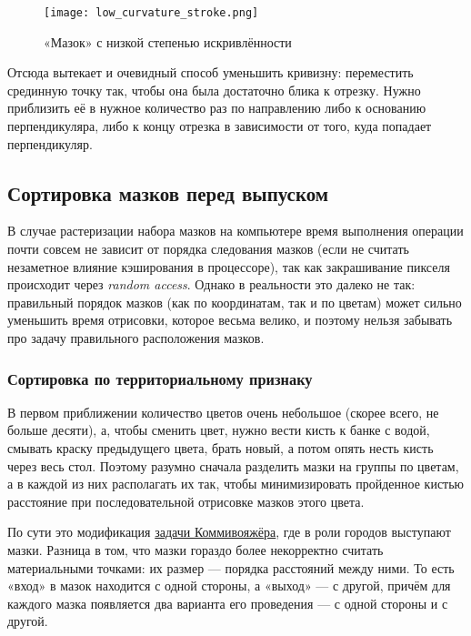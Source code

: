 \begin{figure}[h!]
    \centering
    \texttt{[image: low\_curvature\_stroke.png]}
    \caption{«Мазок» с низкой степенью искривлённости}
    \label{fig:low_curvature_stroke}
\end{figure}
\FloatBarrier

Отсюда вытекает и очевидный способ уменьшить кривизну: переместить срединную точку так, чтобы она была достаточно блика к отрезку.
Нужно приблизить её в нужное количество раз по направлению либо к основанию перпендикуляра,
либо к концу отрезка в зависимости от того, куда попадает перпендикуляр.


\subsection{Сортировка мазков перед выпуском}\label{subsec:stroke_sorting}

В случае растеризации набора мазков на компьютере время выполнения операции почти совсем не зависит от порядка следования мазков
(если не считать незаметное влияние кэширования в процессоре), так как закрашивание пикселя происходит через \textit{random access}.
Однако в реальности это далеко не так: правильный порядок мазков (как по координатам, так и по цветам) может сильно уменьшить время отрисовки, которое весьма велико,
и поэтому нельзя забывать про задачу правильного расположения мазков.

\subsubsection{Сортировка по территориальному признаку}
В первом приближении количество цветов очень небольшое (скорее всего, не больше десяти),
а, чтобы сменить цвет, нужно вести кисть к банке с водой, смывать краску предыдущего цвета, брать новый,
а потом опять несть кисть через весь стол.
Поэтому разумно сначала разделить мазки на группы по цветам, а в каждой из них располагать их так,
чтобы минимизировать пройденное кистью расстояние при последовательной отрисовке мазков этого цвета.

По сути это модификация \href{https://en.wikipedia.org/wiki/Travelling_salesman_problem}{задачи Коммивояжёра}, где в роли городов выступают мазки.
Разница в том, что мазки гораздо более некорректно считать материальными точками: их размер — порядка расстояний между ними.
То есть «вход» в мазок находится с одной стороны, а «выход» — с другой, причём для каждого мазка появляется два варианта его проведения —
с одной стороны и с другой.

